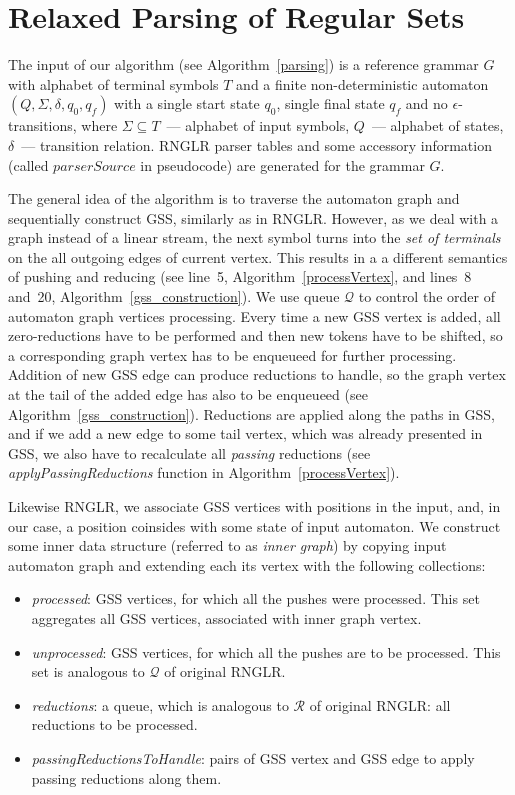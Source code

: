 \section{Relaxed Parsing of Regular Sets}

The input of our algorithm (see Algorithm~\ref{parsing}) is a reference grammar $G$ with alphabet of terminal symbols $T$ 
and a finite non-deterministic automaton $(Q, \Sigma, \delta, q_0, q_f)$ with a single start state $q_0$, single final state $q_f$ 
and no $\epsilon$-transitions, where $\Sigma \subseteq T$~--- alphabet of input symbols, $Q$~--- alphabet of states, 
$\delta$~--- transition relation. RNGLR parser tables and some accessory information (called $parserSource$ in pseudocode) 
are generated for the grammar $G$. 

The general idea of the algorithm is to traverse the automaton graph and sequentially construct GSS, similarly as in RNGLR.
However, as we deal with a graph instead of a linear stream, the next symbol turns into the \emph{set of terminals} on the 
all outgoing edges of current vertex. This results in a a different semantics of pushing and reducing (see line~5, 
Algorithm~\ref{processVertex}, and lines~8 and~20, Algorithm~\ref{gss_construction}). We use queue $\mathcal Q$ to control the 
order of automaton graph vertices processing. Every time a new GSS vertex is added, all zero-reductions have to be performed 
and then new tokens have to be shifted, so a corresponding graph vertex has to be enqueueed for further processing. 
Addition of new GSS edge can produce reductions to handle, so the graph vertex at the tail of the added edge has 
also to be enqueueed (see Algorithm~\ref{gss_construction}). Reductions are applied along the paths in GSS, and if we add
a new edge to some tail vertex, which was already presented in GSS, we also have to recalculate all \emph{passing} reductions
(see \emph{applyPassingReductions} function in Algorithm~\ref{processVertex}).

Likewise RNGLR, we associate GSS vertices with positions in the input,
and, in our case, a position coinsides with some state of input automaton. We construct some
inner data structure (referred to as \emph{inner graph}) by copying input automaton graph and 
extending each its vertex with the following collections: 

\begin{itemize}
  \item \emph{processed}: GSS vertices, for which all the pushes were processed. 
   This set aggregates all GSS vertices, associated with inner graph vertex.
  \item \emph{unprocessed}: GSS vertices, for which all the pushes are to be processed. 
   This set is analogous to $\mathcal{Q}$ of original RNGLR.
  \item \emph{reductions}: a queue, which is analogous to $\mathcal{R}$ of original RNGLR: 
   all reductions to be processed.
  \item \emph{passingReductionsToHandle}: pairs of GSS vertex and GSS edge to apply 
   passing reductions along them.
\end{itemize}

